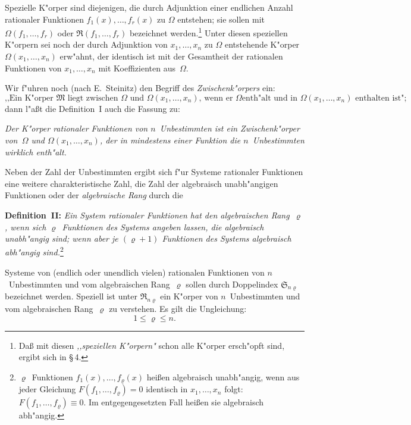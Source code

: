 \documentclass[11pt,a4paper]{article}
\begin{document}
Spezielle K"{o}rper sind diejenigen, die durch Adjunktion einer endlichen
Anzahl rationaler Funktionen $f_{1}(x),\dots,f_{r}(x)$ zu $\Omega$ entstehen; sie sollen mit
$\Omega(f_{1},\dots,f_{r})$ oder $\mathfrak{R}(f_{1},\dots,f_{r})$ bezeichnet werden.\footnote{Da\ss{} mit diesen
\emph{,,speziellen K"{o}rpern"{}} schon alle K"{o}rper ersch"{o}pft sind, ergibt sich in \S\,4.}
Unter diesen speziellen K"{o}rpern sei noch der durch Adjunktion von
$x_{1},\dots,x_{n}$ zu $\Omega$ entstehende K"{o}rper $\Omega(x_{1},\dots,x_{n})$ erw"{a}hnt, der identisch
ist mit der Gesamtheit der rationalen Funktionen von $x_{1},\dots,x_{n}$ mit
Koeffizienten aus~$\Omega$.

Wir f"{u}hren noch (nach E.~Steinitz) den Begriff des \emph{Zwischenk"{o}rpers}
ein:
\[\text{,,Ein K"{o}rper $\mathfrak{M}$ liegt zwischen $\Omega$ und $\Omega(x_{1},\dots,x_{n})$, wenn er $\Omega$
enth"{a}lt und in $\Omega(x_{1},\dots,x_{n})$ enthalten ist";}\]
dann l"{a}\ss{}t die Definition~I auch die Fassung zu:

\emph{Der K"{o}rper rationaler Funktionen von $n$~Unbestimmten ist ein
Zwischenk"{o}rper von~$\Omega$ und $\Omega(x_{1},\dots,x_{n})$, der in mindestens einer Funktion
die $n$~Unbestimmten wirklich enth"{a}lt.}

Neben der Zahl der Unbestimmten ergibt sich f"{u}r Systeme rationaler
Funktionen eine weitere charakteristische Zahl, die Zahl der algebraisch
unabh"{a}ngigen Funktionen oder der \emph{algebraische Rang} durch die

\medskip
\noindent
\textbf{Definition~II:} \emph{Ein System rationaler Funktionen hat den
algebraischen Rang~$\varrho$, wenn sich $\varrho$~Funktionen des Systems angeben lassen,
die algebraisch unabh"{a}ngig sind; wenn aber je $(\varrho+1)$ Funktionen des Systems
algebraisch abh"{a}ngig sind.}\footnote{$\varrho$~Funktionen $f_{1}(x),\dots,f_{\varrho}(x)$ hei\ss{}en algebraisch
unabh"{a}ngig, wenn aus jeder Gleichung $F(f_{1},\dots,f_{\varrho})=0$ identisch in $x_{1},\dots,x_{n}$
folgt: $F(f_{1},\dots,f_{\varrho})\equiv 0$. Im entgegengesetzten Fall hei\ss{}en sie algebraisch abh"{a}ngig.}

Systeme von (endlich oder unendlich vielen) rationalen Funktionen von
$n$~Unbestimmten und vom algebraischen Rang~$\varrho$ sollen durch Doppelindex
$\mathfrak{S}_{n\varrho}$ bezeichnet werden. Speziell ist unter $\mathfrak{R}_{n\varrho}$ ein K"{o}rper von $n$~Unbestimmten
und vom algebraischen Rang~$\varrho$ zu verstehen. Es gilt die Ungleichung:
\[1\le\varrho\le n.\]
\end{document}
